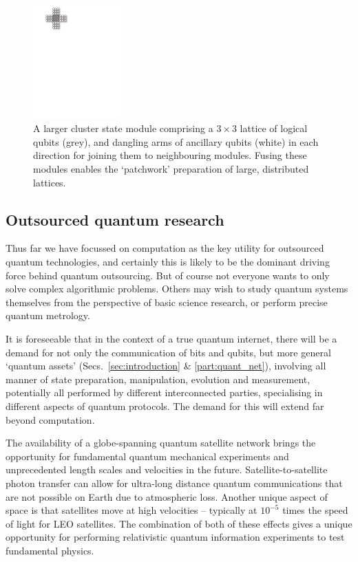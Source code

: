 \begin{figure}[!htbp]
\includegraphics[clip=true, width=0.3\textwidth]{larger_module}
\captionspacefig \caption{A larger cluster state module comprising a \mbox{$3\times 3$} lattice of logical qubits (grey), and dangling arms of ancillary qubits (white) in each direction for joining them to neighbouring modules. Fusing these modules enables the `patchwork' preparation of large, distributed lattices.} \label{fig:larger_module}
\end{figure}

%
%

\subsection{Outsourced quantum research} 

Thus far we have focussed on computation as the key utility for outsourced quantum technologies, and certainly this is likely to be the dominant driving force behind quantum outsourcing. But of course not everyone wants to only solve complex algorithmic problems. Others may wish to study quantum systems themselves from the perspective of basic science research, or perform precise quantum metrology.

It is foreseeable that in the context of a true quantum internet, there will be a demand for not only the communication of bits and qubits, but more general `quantum assets' (Secs.~\ref{sec:introduction} \& \ref{part:quant_net}), involving all manner of state preparation, manipulation, evolution and measurement, potentially all performed by different interconnected parties, specialising in different aspects of quantum protocols. The demand for this will extend far beyond computation.

The availability of a globe-spanning quantum satellite network brings the opportunity for fundamental quantum mechanical experiments and unprecedented length scales and velocities in the future. Satellite-to-satellite photon transfer can allow for ultra-long distance quantum communications that are not possible on Earth due to atmospheric loss. Another unique aspect of space is that satellites move at high velocities -- typically at $10^{-5} $ times the speed of light for LEO satellites. The combination of both of these effects gives a unique opportunity for performing relativistic quantum information experiments to test fundamental physics. 

